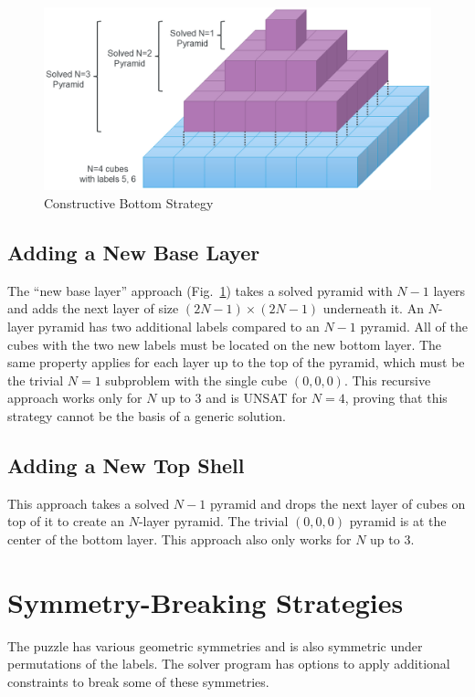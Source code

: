 \documentclass[conference]{IEEEtran}
\begin{document}
\begin{figure}[!t]
\centerline{\includegraphics[width=\linewidth]{constructive_bottom.png}}
\caption{Constructive Bottom Strategy}
\label{constructive_bottom}
\end{figure}

\subsection{Adding a New Base Layer}

The ``new base layer'' approach (Fig.~\ref{constructive_bottom}) takes a solved pyramid with $N-1$ layers and adds the next layer of size $(2N-1)\times(2N-1)$ underneath it.
An $N$\nobreakdash-layer pyramid has two additional labels compared to an $N-1$ pyramid.
All of the cubes with the two new labels must be located on the new bottom layer.
The same property applies for each layer up to the top of the pyramid, which must be the trivial $N=1$ subproblem with the single cube $(0,0,0)$.
This recursive approach works only for $N$ up to 3 and is UNSAT for $N=4$, proving that this strategy cannot be the basis of a generic solution.

\subsection{Adding a New Top Shell}

This approach takes a solved $N-1$ pyramid and drops the next layer of cubes on top of it to create an $N$-layer pyramid.
The trivial $(0,0,0)$ pyramid is at the center of the bottom layer.
This approach also only works for $N$ up to 3.

\section{Symmetry-Breaking Strategies}

The puzzle has various geometric symmetries and is also symmetric under permutations of the labels.
The solver program has options to apply additional constraints to break some of these symmetries.
\end{document}
